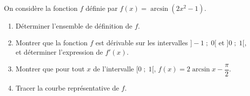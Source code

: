 
\begin{exercice}\label{exoautoanalyseCTU-11}


On considère la fonction $f$ définie par $f(x)=\arcsin(2x^2-1)$.
\begin{enumerate}
\item Déterminer l'ensemble de définition de $f$.
\item Montrer que la fonction $f$ est dérivable sur les intervalles $]-1\;;\;0[$ et  $]0\;;\;1[$, et déterminer l'expression de $f'(x)$.
\item Montrer que pour tout $x$ de l'intervalle $[0\;;\;1[$, $f(x)=2\arcsin x - \dfrac{\pi}{2}$.
\item Tracer la courbe représentative de $f$.
\end{enumerate}






\end{exercice}
